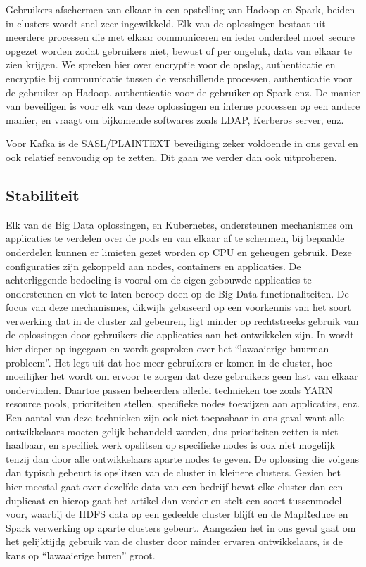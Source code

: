 Gebruikers afschermen van elkaar in een opstelling van Hadoop en Spark, beiden in clusters wordt snel zeer ingewikkeld. Elk van de oplossingen bestaat uit meerdere processen die met elkaar communiceren en ieder onderdeel moet secure opgezet worden zodat gebruikers niet, bewust of per ongeluk, data van elkaar te zien krijgen. We spreken hier over encryptie voor de opslag, authenticatie en encryptie bij communicatie tussen de verschillende processen, authenticatie voor de gebruiker op Hadoop, authenticatie voor de gebruiker op Spark enz.
De manier van beveiligen is voor elk van deze oplossingen en interne processen op een andere manier, en vraagt om bijkomende softwares zoals LDAP, Kerberos server, enz.

Voor Kafka is de SASL/PLAINTEXT beveiliging zeker voldoende in ons geval en ook relatief eenvoudig op te zetten. Dit gaan we verder dan ook uitproberen.

\subsection{Stabiliteit}
Elk van de Big Data oplossingen, en Kubernetes, ondersteunen mechanismes om applicaties te verdelen over de pods en van elkaar af te schermen, bij bepaalde onderdelen kunnen er limieten gezet worden op CPU en geheugen gebruik. Deze configuraties zijn gekoppeld aan nodes, containers en applicaties. De achterliggende bedoeling is vooral om de eigen gebouwde applicaties te ondersteunen en vlot te laten beroep doen op de Big Data functionaliteiten. De focus van deze mechanismes, dikwijls gebaseerd op een voorkennis van het soort verwerking dat in de cluster zal gebeuren, ligt minder op rechtstreeks gebruik van de oplossingen door gebruikers die applicaties aan het ontwikkelen zijn.
\newline
\newline
In \textcite{Deane2019} wordt hier dieper op ingegaan en wordt gesproken over het ``lawaaierige buurman probleem''. Het legt uit dat hoe meer gebruikers er komen in de cluster, hoe moeilijker het wordt om ervoor te zorgen dat deze gebruikers geen last van elkaar ondervinden. Daartoe passen beheerders allerlei technieken toe zoals YARN resource pools, prioriteiten stellen, specifieke nodes toewijzen aan applicaties, enz. Een aantal van deze technieken zijn ook niet toepasbaar in ons geval want alle ontwikkelaars moeten gelijk behandeld worden, dus prioriteiten zetten is niet haalbaar, en specifiek werk opslitsen op specifieke nodes is ook niet mogelijk tenzij dan door alle ontwikkelaars aparte nodes te geven.
De oplossing die volgens \textcite{Deane2019a} dan typisch gebeurt is opslitsen van de cluster in kleinere clusters. Gezien het hier meestal gaat over dezelfde data van een bedrijf bevat elke cluster dan een duplicaat en hierop gaat het artikel dan verder en stelt een soort tussenmodel voor, waarbij de HDFS data op een gedeelde cluster blijft en de MapReduce en Spark verwerking op aparte clusters gebeurt.
\newline
Aangezien het in ons geval gaat om het gelijktijdg gebruik van de cluster door minder ervaren ontwikkelaars, is de kans op ``lawaaierige buren'' groot.


